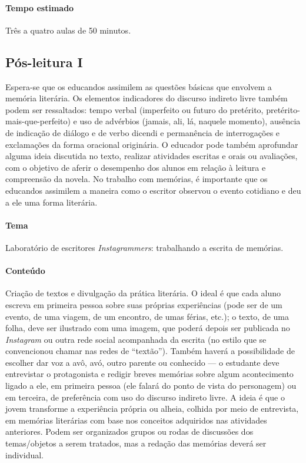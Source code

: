 \documentclass{article}
\begin{document}
\paragraph{Tempo estimado} Três a quatro aulas de 50 minutos.

\subsection{Pós-leitura I}


Espera-se que os educandos assimilem as questões básicas que envolvem
a memória literária. Os elementos indicadores do discurso indireto livre
também podem ser ressaltados: tempo verbal (imperfeito ou futuro do
pretérito, pretérito-mais-que-perfeito) e uso de advérbios (jamais, ali,
lá, naquele momento), ausência de indicação de diálogo e de verbo
dicendi e permanência de interrogações e exclamações da forma oracional
originária. O educador pode também aprofundar alguma ideia discutida no
texto, realizar atividades escritas e orais ou avaliações, com o
objetivo de aferir o desempenho dos alunos em relação à leitura e
compreensão da novela. No trabalho com memórias, é importante que os
educandos assimilem a maneira como o escritor observou o evento
cotidiano e deu a ele uma forma literária.

\paragraph{Tema} Laboratório de escritores \emph{Instagrammers}: trabalhando a escrita de memórias.

\paragraph{Conteúdo} Criação de textos e divulgação da prática literária.
O ideal é que cada aluno escreva em primeira pessoa sobre suas próprias
experiências (pode ser de um evento, de uma viagem, de um encontro, de
umas férias, etc.); o texto, de uma folha, deve ser ilustrado com uma
imagem, que poderá depois ser publicada no \emph{Instagram} ou outra
rede social acompanhada da escrita (no estilo que se convencionou chamar
nas redes de ``textão''). Também haverá a possibilidade de escolher dar
voz a avô, avó, outro parente ou conhecido --- o estudante deve
entrevistar o protagonista e redigir breves memórias sobre algum
acontecimento ligado a ele, em primeira pessoa (ele falará do ponto de
vista do personagem) ou em terceira, de preferência com uso do discurso
indireto livre. A ideia é que o jovem transforme a experiência própria
ou alheia, colhida por meio de entrevista, em memórias literárias com
base nos conceitos adquiridos nas atividades anteriores. Podem ser
organizados grupos ou rodas de discussões dos temas/objetos a serem
tratados, mas a redação das memórias deverá ser individual.
\end{document}
